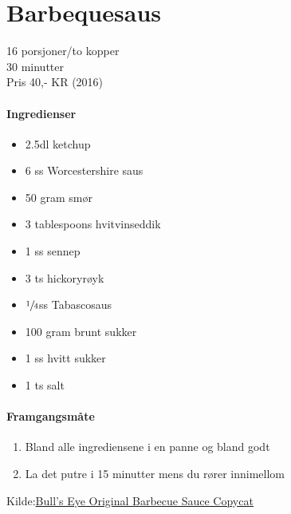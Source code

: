 \section{Barbequesaus}
\label{bbq}

16 porsjoner/to kopper\\
30 minutter \\
Pris 40,- KR (2016)\\

\paragraph{Ingredienser}
\begin{itemize}[noitemsep]
		\item 2.5dl ketchup     %
    \item 6 ss Worcestershire saus 	    %
    \item 50 gram smør 	    %
    \item 3 tablespoons hvitvinseddik     %
    \item 1 ss sennep     %
    \item 3 ts hickoryrøyk 	    %
    \item $\sfrac{1}{4}$ss Tabascosaus 	    %
    \item 100 gram brunt sukker 	    %
    \item 1 ss hvitt sukker     %
    \item 1 ts salt 	    %
\end{itemize}

\paragraph{Framgangsmåte}
\begin{enumerate}[noitemsep]
	\item Bland alle ingrediensene i en panne og bland godt
	\item La det putre i 15 minutter mens du rører innimellom
\end{enumerate}

Kilde:\href{http://www.food.com/recipe/bulls-eye-original-barbecue-sauce-copycat-323641}{Bull's Eye Original Barbecue Sauce Copycat}


